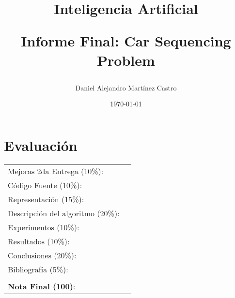 \documentclass[letter, 10pt]{article}
\begin{document}
\title{Inteligencia Artificial \\ \begin{Large}Informe Final: Car Sequencing Problem\end{Large}}
\author{Daniel Alejandro Mart\'inez Castro}
\date{\today}
\maketitle


\section*{Evaluaci\'on}

\begin{tabular}{ll}
Mejoras 2da Entrega (10\%): &  \underline{\hspace{2cm}}\\
C\'odigo Fuente (10\%): &  \underline{\hspace{2cm}}\\
Representaci\'on (15\%):  & \underline{\hspace{2cm}} \\
Descripci\'on del algoritmo (20\%):  & \underline{\hspace{2cm}} \\
Experimentos (10\%):  & \underline{\hspace{2cm}} \\
Resultados (10\%):  & \underline{\hspace{2cm}} \\
Conclusiones (20\%): &  \underline{\hspace{2cm}}\\
Bibliograf\'ia (5\%): & \underline{\hspace{2cm}}\\
 &  \\
\textbf{Nota Final (100)}:   & \underline{\hspace{2cm}}
\end{tabular}
\end{document}
